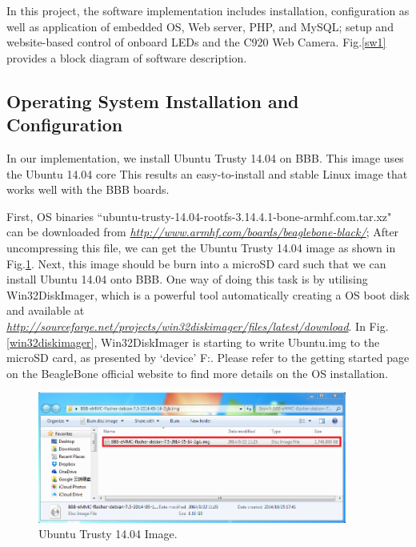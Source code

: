 \documentclass[12pt,journal,draftclsnofoot,onecolumn]{IEEEtran}
\begin{document}
In this project, the software implementation includes installation, configuration as well as application of embedded OS, Web server, PHP, and MySQL; setup and website-based control of onboard LEDs and the C920 Web Camera. Fig.\ref{sw1} provides a block diagram of software description.

	\subsection{Operating System Installation and Configuration}\label{Sys}
	In our implementation, we install Ubuntu Trusty 14.04 on BBB. This image uses the Ubuntu 14.04 core This results an easy-to-install and stable Linux image that works well with the BBB boards.

First, OS binaries ``ubuntu-trusty-14.04-rootfs-3.14.4.1-bone-armhf.com.tar.xz" can be downloaded from \textcolor{blue}{\textit{\url{http://www.armhf.com/boards/beaglebone-black/}}}; After uncompressing this file, we can get the Ubuntu Trusty 14.04 image as shown in Fig.\ref{osimage}. Next, this image should be burn into a microSD card such that we can install Ubuntu 14.04 onto BBB. One way of doing this task is by utilising Win32DiskImager, which is a powerful tool automatically creating a OS boot disk and available at \textcolor{blue}{\textit{\url{http://sourceforge.net/projects/win32diskimager/files/latest/download}}}. In Fig.\ref{win32diskimager}, Win32DiskImager is starting to write Ubuntu.img to the microSD card, as presented by `device' F:. Please refer to the getting started page on the BeagleBone official website \cite{startBB} to find more details on the OS installation.

\begin{figure}[htb]
	\centering
	\includegraphics[width=4in]{./figs/osimage.PNG}
	\caption{Ubuntu Trusty 14.04 Image.}
	\label{osimage}
\end{figure}
\end{document}
